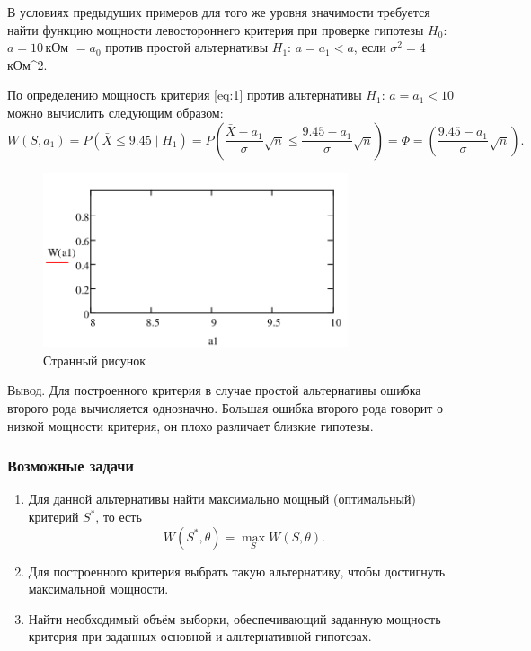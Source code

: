 \begin{ex}
	В условиях предыдущих примеров для того же уровня значимости требуется найти
	функцию мощности левостороннего критерия при проверке гипотезы $ H_0 $: $ a =
	10$\,кОм $ = a_0 $ против простой альтернативы $ H_1 $: $ a = a_1 < a $, если
	$ \sigma^2 = 4 $\,кОм^2.
\begin{solution}
	По определению мощность критерия \eqref{eq:1} против альтернативы $ H_1 $: $ a
	= a_1 < 10$ можно вычислить следующим образом: 
	\[
			W(S, a_1) = P(\bar X \leqslant 9.45\mid H_1) = P \left( \frac{\bar X -
			a_1}{\sigma} \sqrt n \leqslant \frac{9.45 - a_1}{\sigma} \sqrt n \right) =
			\Phi = \left( \frac{9.45 - a_1}{\sigma}\sqrt n \right).
	\]
	\begin{figure}[h!]
		\centering
		\includegraphics[width=0.8\textwidth]{Figures/9-plot2.png}
    \caption{Странный рисунок}
		\label{fig:9-plot2}
	\end{figure}
\end{solution}
\end{ex}

\textsc{Вывод}.
Для построенного критерия в случае простой альтернативы ошибка второго рода 
вычисляется однозначно. 
 Большая ошибка второго рода говорит о низкой мощности критерия, он плохо различает 
близкие гипотезы. 

\subsubsection{Возможные задачи}
\begin{enumerate}
	\item Для данной альтернативы найти максимально мощный (оптимальный) критерий
		$ S^\ast $, то есть  
		\[
				W(S^\ast, \theta) = \max_S W(S,\theta).
		\]
	\item Для построенного критерия выбрать такую альтернативу, чтобы достигнуть
		максимальной мощности.
	\item Найти необходимый объём выборки, обеспечивающий заданную мощность
		критерия при заданных основной и альтернативной гипотезах.
\end{enumerate}


